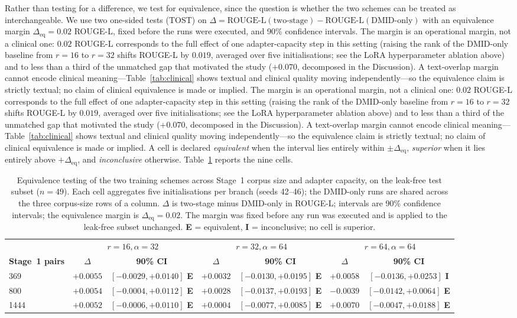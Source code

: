 \documentclass{wlscirep}
\newif\ifmarkup
\newif\ifmarkbar
\newcommand{\rev}[1]{%
  \ifmarkup
    \ifmarkbar\cbstart#1\cbend\else\textcolor{revised}{#1}\fi
  \else#1\fi}
\begin{document}
Rather than testing for a difference, we test for equivalence, since the question is whether the two schemes can be treated as interchangeable. We use two one-sided tests (TOST) on $\Delta = \text{ROUGE-L}(\text{two-stage}) - \text{ROUGE-L}(\text{DMID-only})$ with an equivalence margin $\Delta_{\text{eq}} = 0.02$ ROUGE-L, fixed before the runs were executed, and 90\% confidence intervals. \rev{The margin is an operational margin, not a clinical one: $0.02$ ROUGE-L corresponds to the full effect of one adapter-capacity step in this setting (raising the rank of the DMID-only baseline from $r=16$ to $r=32$ shifts ROUGE-L by $0.019$, averaged over five initialisations; see the LoRA hyperparameter ablation above) and to less than a third of the unmatched gap that motivated the study ($+0.070$, decomposed in the Discussion). A text-overlap margin cannot encode clinical meaning---Table~\ref{tab:clinical} shows textual and clinical quality moving independently---so the equivalence claim is strictly textual; no claim of clinical equivalence is made or implied.} A cell is declared \emph{equivalent} when the interval lies entirely within $\pm\Delta_{\text{eq}}$, \emph{superior} when it lies entirely above $+\Delta_{\text{eq}}$, and \emph{inconclusive} otherwise. Table~\ref{tab:tost} reports the nine cells.

\begin{table}[H]
\centering
\caption{Equivalence testing of the two training schemes across Stage~1 corpus size and adapter capacity, on the leak-free test subset ($n=49$). Each cell aggregates five initialisations per branch (seeds 42--46); the DMID-only runs are shared across the three corpus-size rows of a column. $\Delta$ is two-stage minus DMID-only in ROUGE-L; intervals are 90\% confidence intervals; the equivalence margin is $\Delta_{\text{eq}} = 0.02$. The margin was fixed before any run was executed and is applied to the leak-free subset unchanged. \textbf{E} = equivalent, \textbf{I} = inconclusive; no cell is superior.}
\label{tab:tost}
\begin{adjustbox}{max width=\textwidth}
\begin{tabular}{lcccccc}
\toprule
& \multicolumn{2}{c}{$r=16, \alpha=32$} & \multicolumn{2}{c}{$r=32, \alpha=64$} & \multicolumn{2}{c}{$r=64, \alpha=64$} \\
\cmidrule(lr){2-3} \cmidrule(lr){4-5} \cmidrule(lr){6-7}
\textbf{Stage~1 pairs} & $\Delta$ & \textbf{90\% CI} & $\Delta$ & \textbf{90\% CI} & $\Delta$ & \textbf{90\% CI} \\
\midrule
369 & $+0.0055$ & $[-0.0029, +0.0140]$ \textbf{E} & $+0.0032$ & $[-0.0130, +0.0195]$ \textbf{E} & $+0.0058$ & $[-0.0136, +0.0253]$ \textbf{I} \\
800 & $+0.0054$ & $[-0.0004, +0.0112]$ \textbf{E} & $+0.0028$ & $[-0.0137, +0.0193]$ \textbf{E} & $-0.0039$ & $[-0.0142, +0.0064]$ \textbf{E} \\
1444 & $+0.0052$ & $[-0.0006, +0.0110]$ \textbf{E} & $+0.0004$ & $[-0.0077, +0.0085]$ \textbf{E} & $+0.0070$ & $[-0.0047, +0.0188]$ \textbf{E} \\
\bottomrule
\end{tabular}
\end{adjustbox}
\end{table}
\end{document}
